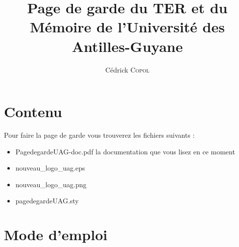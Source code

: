 \documentclass[10pt]{article}
\title{Page de garde du TER et du M\'emoire de l'Universit\'e des Antilles-Guyane}
\author{C\'edrick \textsc{Copol}}
\begin{document}
\maketitle
\tableofcontents

\section{Contenu }
Pour faire la page de garde vous trouverez les fichiers suivants :

\begin{itemize}
 \item	PagedegardeUAG-doc.pdf \og la documentation que vous lisez en ce moment \fg{}
 \item	nouveau\_logo\_uag.eps
 \item	nouveau\_logo\_uag.png
 \item	pagedegardeUAG.sty
\end{itemize}

\section{Mode d'emploi }
\end{document}
